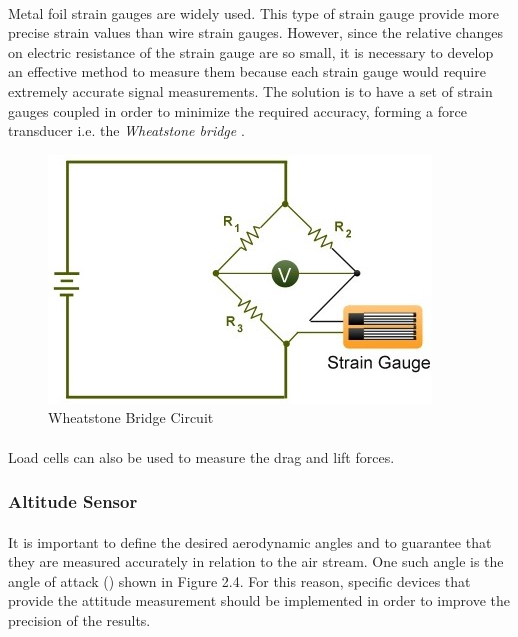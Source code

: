 \paragraph{}Metal foil strain gauges are widely used. This type of strain gauge provide more precise strain values than wire strain gauges. However, since the relative changes on electric resistance of the strain gauge are so small, it is necessary to develop an effective method to measure them because each strain gauge would require extremely accurate signal measurements. The solution is to have a set of strain gauges coupled in order to minimize the required accuracy, forming a force transducer i.e. the \textit{Wheatstone bridge}
\cite{fernandes_design_nodate}.
	\begin{figure}[!h]
	\includegraphics{Figures/Fig9}
	\caption{Wheatstone Bridge Circuit}
	\end{figure}
\paragraph{}Load cells can also be used to measure the drag and lift forces.
\subsubsection{Altitude Sensor}
\paragraph{}It is important to define the desired aerodynamic angles and to guarantee that they are measured accurately in relation to the air stream. One such angle is the angle of attack (\textalpha) shown in Figure 2.4. For this reason, specific devices that provide the attitude measurement should be implemented in order to improve the precision of the results.
